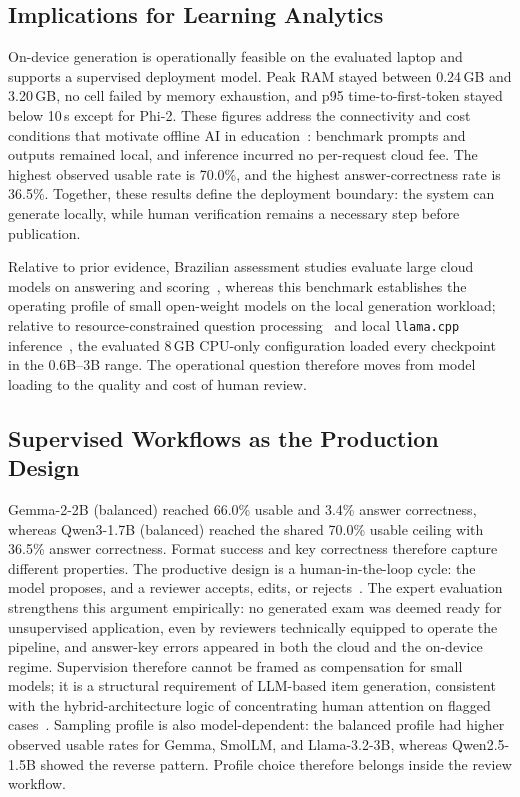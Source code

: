 \documentclass[fleqn,10pt]{JLA_article}
\begin{document}
\subsection{Implications for Learning Analytics}
On-device generation is operationally feasible on the evaluated laptop and supports a supervised deployment model. Peak RAM stayed between 0.24\,GB and 3.20\,GB, no cell failed by memory exhaustion, and p95 time-to-first-token stayed below 10\,s except for Phi-2. These figures address the connectivity and cost conditions that motivate offline AI in education~\autocite{mello2023offline,portela2023aied,portela2024unplugged,portela2024gdpr}: benchmark prompts and outputs remained local, and inference incurred no per-request cloud fee. The highest observed usable rate is 70.0\%, and the highest answer-correctness rate is 36.5\%. Together, these results define the deployment boundary: the system can generate locally, while human verification remains a necessary step before publication.

Relative to prior evidence, Brazilian assessment studies evaluate large cloud models on answering and scoring~\autocite{rodrigues2025llms,lobo2025scoring}, whereas this benchmark establishes the operating profile of small open-weight models on the local generation workload; relative to resource-constrained question processing~\autocite{rodrigues2023question} and local \texttt{llama.cpp} inference~\autocite{monteiro2025smalldevice}, the evaluated 8\,GB CPU-only configuration loaded every checkpoint in the 0.6B--3B range. The operational question therefore moves from model loading to the quality and cost of human review.

\subsection{Supervised Workflows as the Production Design}
Gemma-2-2B (balanced) reached 66.0\% usable and 3.4\% answer correctness, whereas Qwen3-1.7B (balanced) reached the shared 70.0\% usable ceiling with 36.5\% answer correctness. Format success and key correctness therefore capture different properties. The productive design is a human-in-the-loop cycle: the model proposes, and a reviewer accepts, edits, or rejects~\autocite{guerino2025mathaide,rosa2026automated}. The expert evaluation strengthens this argument empirically: no generated exam was deemed ready for unsupervised application, even by reviewers technically equipped to operate the pipeline, and answer-key errors appeared in both the cloud and the on-device regime. Supervision therefore cannot be framed as compensation for small models; it is a structural requirement of LLM-based item generation, consistent with the hybrid-architecture logic of concentrating human attention on flagged cases~\autocite{sarmanho2026ocr}. Sampling profile is also model-dependent: the balanced profile had higher observed usable rates for Gemma, SmolLM, and Llama-3.2-3B, whereas Qwen2.5-1.5B showed the reverse pattern. Profile choice therefore belongs inside the review workflow.
\end{document}
